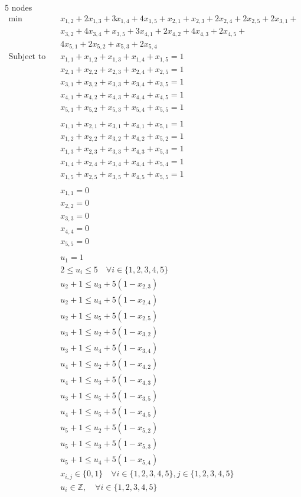 \documentclass[../open-optimization/open-optimization.tex]{subfiles}
\begin{document}
\begin{example}{5 nodes}
\begin{align*}\min\quad & x_{1,2} + 2 x_{1,3} + 3 x_{1,4} + 4 x_{1,5} + x_{2,1} + x_{2,3} + 2 x_{2,4} + 2 x_{2,5} + 2 x_{3,1} + \\&x_{3,2} + 4 x_{3,4} + x_{3,5} + 3 x_{4,1} + 2 x_{4,2} + 4 x_{4,3} + 2 x_{4,5} + \\&4 x_{5,1} + 2 x_{5,2} + x_{5,3} + 2 x_{5,4}\\
\text{Subject to} \quad  
 & x_{1,1} + x_{1,2} + x_{1,3} + x_{1,4} + x_{1,5} = 1\\
 & x_{2,1} + x_{2,2} + x_{2,3} + x_{2,4} + x_{2,5} = 1\\
 & x_{3,1} + x_{3,2} + x_{3,3} + x_{3,4} + x_{3,5} = 1\\
 & x_{4,1} + x_{4,2} + x_{4,3} + x_{4,4} + x_{4,5} = 1\\
 & x_{5,1} + x_{5,2} + x_{5,3} + x_{5,4} + x_{5,5} = 1\\
 \\
&x_{1,1} + x_{2,1} + x_{3,1} + x_{4,1} + x_{5,1} = 1\\
 & x_{1,2} + x_{2,2} + x_{3,2} + x_{4,2} + x_{5,2} = 1\\
 & x_{1,3} + x_{2,3} + x_{3,3} + x_{4,3} + x_{5,3} = 1\\
 & x_{1,4} + x_{2,4} + x_{3,4} + x_{4,4} + x_{5,4} = 1\\
 & x_{1,5} + x_{2,5} + x_{3,5} + x_{4,5} + x_{5,5} = 1\\
\\
 & x_{1,1} = 0\\
 & x_{2,2} = 0\\
 & x_{3,3} = 0\\
 & x_{4,4} = 0\\
 & x_{5,5} = 0\\
 \\
 & u_{1} = 1\\
 & 2 \leq u_{i} \leq 5 \quad\forall i \in \{1,2,3,4,5\}\\
 & u_{2} +1 \leq u_{3} + 5 (1-x_{2,3})\\
 & u_{2} +1 \leq u_{4} + 5  (1-x_{2,4})\\
  & u_{2} +1 \leq  u_{5} + 5 (1-x_{2,5} )\\
 & u_{3} +1 \leq u_{2} + 5  (1-x_{3,2})\\
 & u_{3} +1 \leq u_{4} + 5  (1-x_{3,4})\\
 & u_{4} +1 \leq u_{2} + 5  (1-x_{4,2})\\
 & u_{4} +1 \leq u_{3} + 5  (1-x_{4,3})\\
 & u_{3} +1 \leq  u_{5} + 5 (1-x_{3,5} )\\
 & u_{4} +1 \leq  u_{5} + 5 (1-x_{4,5})\\
 & u_{5} +1 \leq  u_{2} + 5 (1-x_{5,2} )\\
 & u_{5}+1 \leq  u_{3} + 5 (1-x_{5,3} )\\
 & u_{5} +1 \leq  u_{4} + 5 (1-x_{5,4} )\\
 & x_{i,j} \in \{0,1\} \quad\forall i \in \{1,2,3,4,5\}, j \in \{1,2,3,4,5\}\\
 & u_{i} \in \mathbb{Z}, \quad\forall i \in \{1,2,3,4,5\}
\end{align*}
\end{example}
\end{document}
